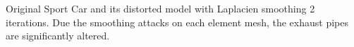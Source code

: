 Original Sport Car and its distorted model with Laplacien smoothing 2 iterations. Due the smoothing attacks on each element mesh, the exhaust pipes are significantly altered.